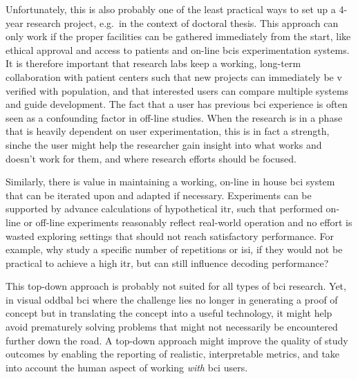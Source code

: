 Unfortunately, this is also probably one of the least practical ways to set up
a 4-year research project, e.g.\ in the context of doctoral thesis.
This approach can only work if the proper facilities can be gathered immediately
from the start, like ethical approval and access to patients and on-line \acp{bci}
experimentation systems.
It is therefore important that research labs keep a working, long-term
collaboration with patient centers such that new projects can immediately be v
verified with population, and that interested users can compare multiple systems
and guide development.
The fact that a user has previous \ac{bci} experience is often seen as a confounding
factor in off-line studies.
When the research is in a phase that is heavily dependent on user
experimentation,
this is in fact a strength, sinche the user might help the researcher gain
insight into what works and doesn't work for them, and where research efforts
should be focused.

Similarly, there is value in maintaining a working, on-line in house \ac{bci}
system that can be iterated upon and adapted if necessary.
Experiments can be supported by advance calculations of hypothetical
\ac{itr}, such that performed on-line or off-line experiments reasonably reflect
real-world operation and no effort is wasted exploring settings that should not
reach satisfactory performance.
For example, why study a specific number of repetitions or \ac{isi}, if they
would not be practical to achieve a high \ac{itr}, but can still influence
decoding performance?

This top-down approach is probably not suited for all types of \ac{bci}
research.
Yet, in visual oddbal \ac{bci} where the challenge lies no longer in generating
a proof of concept but in translating the concept into a useful technology, it
might help avoid prematurely solving problems that might not necessarily be
encountered further down the road.
A top-down approach might improve the quality of study outcomes by enabling the
reporting of realistic, interpretable metrics,
and take into account the human aspect of working \emph{with} \ac{bci} users.
